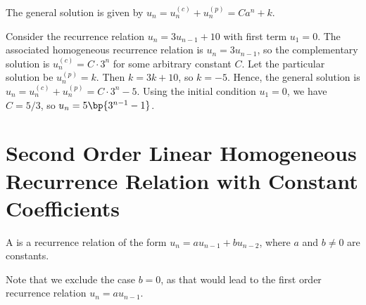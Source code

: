 \begin{fact}
    The general solution is given by $u_n = u_n^{(c)} + u_n^{(p)} = Ca^n + k$.
\end{fact}

\begin{example}
    Consider the recurrence relation $u_n = 3u_{n-1} + 10$ with first term $u_1 = 0$. The associated homogeneous recurrence relation is $u_n = 3u_{n-1}$, so the complementary solution is $u_n^{(c)} = C \cdot 3^n$ for some arbitrary constant $C$. Let the particular solution be $u_n^{(p)} = k$. Then $k = 3 k + 10$, so $k = -5$. Hence, the general solution is $u_n = u_n^{(c)} + u_n^{(p)} = C\cdot 3^n - 5$. Using the initial condition $u_1 = 0$, we have $C = 5/3$, so $u_n = 5 \bp{3^{n-1} - 1}$.
\end{example}

\section{Second Order Linear Homogeneous Recurrence Relation with Constant Coefficients}

\begin{definition}
    A  is a recurrence relation of the form $u_n = a u_{n-1} + b u_{n-2}$, where $a$ and $b \neq 0$ are constants.
\end{definition}

Note that we exclude the case $b = 0$, as that would lead to the first order recurrence relation $u_n = a u_{n-1}$.

